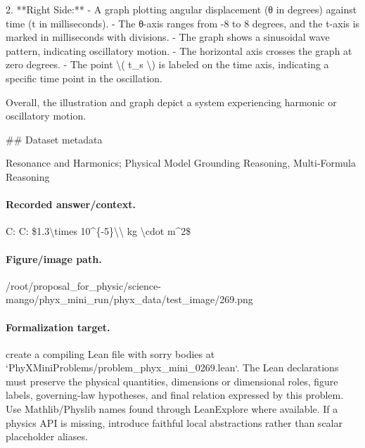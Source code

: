 2. **Right Side:**
   - A graph plotting angular displacement (θ in degrees) against time (t in milliseconds).
   - The θ-axis ranges from -8 to 8 degrees, and the t-axis is marked in milliseconds with divisions.
   - The graph shows a sinusoidal wave pattern, indicating oscillatory motion.
   - The horizontal axis crosses the graph at zero degrees.
   - The point \textbackslash{}( t\_s \textbackslash{}) is labeled on the time axis, indicating a specific time point in the oscillation.

Overall, the illustration and graph depict a system experiencing harmonic or oscillatory motion.

\#\# Dataset metadata

Resonance and Harmonics; Physical Model Grounding Reasoning, Multi-Formula Reasoning

\paragraph{Recorded answer/context.}
C: C: \$1.3\textbackslash{}times 10\textasciicircum{}\{-5\}\textbackslash{}\textbackslash{} kg \textbackslash{}cdot m\textasciicircum{}2\$

\paragraph{Figure/image path.}
/root/proposal\_for\_physic/science-mango/phyx\_mini\_run/phyx\_data/test\_image/269.png

\paragraph{Formalization target.}
create a compiling Lean file with sorry bodies at `PhyXMiniProblems/problem\_phyx\_mini\_0269.lean`. The Lean declarations must preserve the physical quantities, dimensions or dimensional roles, figure labels, governing-law hypotheses, and final relation expressed by this problem.
Use Mathlib/Physlib names found through LeanExplore where available. If a physics API is missing, introduce faithful local abstractions rather than scalar placeholder aliases.

